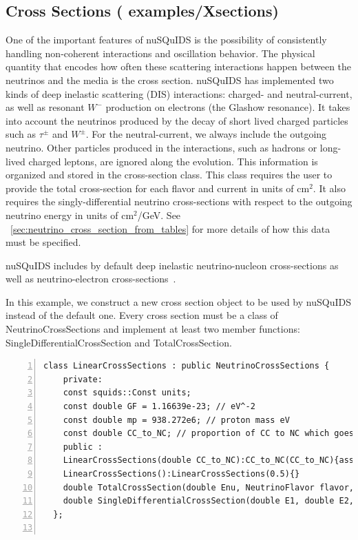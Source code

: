\documentclass[3p,12pt]{elsarticle}
\newcommand{\ttf}{\ttfamily}
\begin{document}
\subsection{Cross Sections \textnormal{({\ttf
      examples/Xsections})}}

One of the important features of {\ttf nuSQuIDS} is the possibility of consistently handling non-coherent interactions and oscillation
behavior. The physical quantity that encodes how often these scattering
interactions happen between the neutrinos and the media is the cross
section.
{\ttf nuSQuIDS} has implemented two kinds of deep inelastic scattering (DIS) interactions: charged- and
neutral-current, as well as resonant $W^-$ production on electrons (the Glashow resonance). It takes into account
the neutrinos produced by the decay of short lived charged particles
such as $\tau^\pm$ and $W^\pm$. For the neutral-current, we always include
the outgoing neutrino.
Other particles produced in the interactions, such as hadrons or long-lived
charged leptons, are ignored along the evolution.
This information is organized and stored in the cross-section class.
This class requires the user to provide the total cross-section for
each flavor and current in units of cm$^2$. It also requires
the singly-differential neutrino cross-sections with respect to
the outgoing neutrino energy in units of cm$^2$/GeV.
See ~\ref{sec:neutrino_cross_section_from_tables} for more details of how this data must be specified. 

{\ttf nuSQuIDS} includes by default deep inelastic neutrino-nucleon
cross-sections as well as neutrino-electron
cross-sections~\citep{Gandhi:1998ri, CooperSarkar:2011pa}.

In this example, we construct a new cross section object to be used by
{\ttf nuSQuIDS} instead of the default one.
Every cross section must be a class of {\ttf NeutrinoCrossSections}
and implement at least two member functions:
{\ttf SingleDifferentialCrossSection} and {\ttf TotalCrossSection}.


\begin{lstlisting}[frame=leftline, numbers =
  left,breaklines=true,label = ex:sin1]
  class LinearCrossSections : public NeutrinoCrossSections {
    private:
    const squids::Const units;
    const double GF = 1.16639e-23; // eV^-2
    const double mp = 938.272e6; // proton mass eV
    const double CC_to_NC; // proportion of CC to NC which goes from 0 to 1.
    public :
    LinearCrossSections(double CC_to_NC):CC_to_NC(CC_to_NC){assert( CC_to_NC <= 1.0  && CC_to_NC >= 0.0 );}
    LinearCrossSections():LinearCrossSections(0.5){}
    double TotalCrossSection(double Enu, NeutrinoFlavor flavor, NeutrinoType neutype, Current current) const override;
    double SingleDifferentialCrossSection(double E1, double E2, NeutrinoFlavor flavor, NeutrinoType neutype, Current current) const override;
  };  
 
\end{lstlisting}
\end{document}
